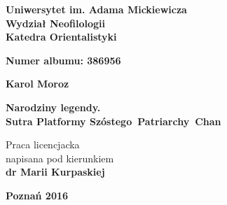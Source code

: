 \begin{titlepage}%
  \begin{center}%
    {\Large \textbf{Uniwersytet im. Adama Mickiewicza\\ Wydział Neofilologii\\ Katedra Orientalistyki}\par}
    \par
    \vspace{2cm}
    {\large \textbf{Numer albumu: 386956}\par}
    \vspace{2cm}
    {{\Large\bfseries Karol Moroz}\par}
  \end{center}%
   \vspace{8mm plus 1mm minus 2mm}
  \begin{center}%
    {\Huge\textbf{Narodziny legendy.\\Sutra Platformy Szóstego~Patriarchy~Chan}\par}
    \vspace{3cm}
    \begin{flushright}\large
        Praca licencjacka\\[3pt]
        napisana pod kierunkiem\\[3pt]
        \bfseries dr Marii Kurpaskiej
    \end{flushright}
    \vspace{15mm plus .1fill}
    {\Large\bfseries Poznań 2016\par}
  \end{center}
\end{titlepage}%
